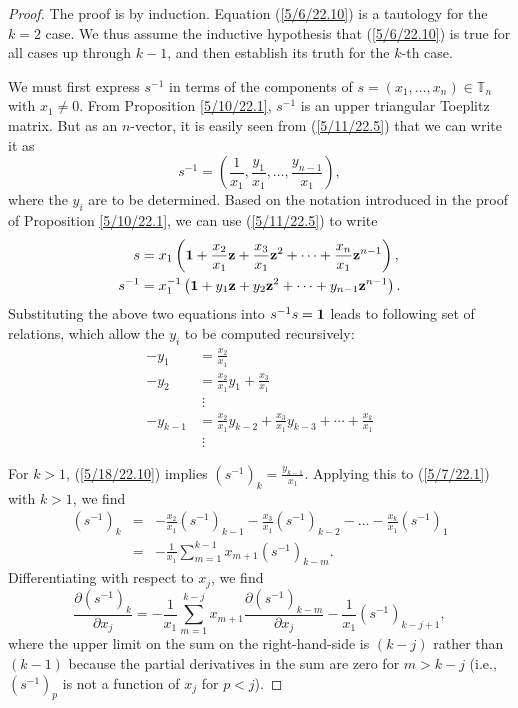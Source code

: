 \documentclass{amsart}
\theoremstyle{definition}
\numberwithin{theorem}{section}
\numberwithin{equation}{section}
\begin{document}
\begin{proof} The proof is by induction. Equation (\ref{5/6/22.10}) is a tautology for the $k=2$ case.  We thus assume the inductive hypothesis that (\ref{5/6/22.10}) is true  for all cases up through $k-1$, and then establish its truth for the $k$-th case.


We must first express $s^{-1}$ in terms of the components of  $s=(x_1,\dots,x_n)\in \mathbb{T}_n$ with $x_1\ne 0$.   From Proposition \ref{5/10/22.1},  $s^{-1}$ is an upper triangular Toeplitz matrix.  But as an $n$-vector, it is easily seen from (\ref{5/11/22.5}) that we can write it as  \begin{equation}\label{5/9/22.1} s^{-1} = (\frac{1}{x_1}, \frac{y_1}{x_1},\dots, \frac{y_{n-1}}{x_1}),\end{equation} where the $y_i$ are to be determined. 
Based on the notation introduced in the proof of Proposition \ref{5/10/22.1}, we can use (\ref{5/11/22.5}) to write 
\begin{align}\nonumber s &= x_1 \left({\bf 1} + \frac{x_2}{x_1} {\bf z} + \frac{x_3}{x_1} {\bf z}^2 + \cdots + \frac{x_n}{x_1} {\bf z}^{n-1}\right), \\ s^{-1} &= x_1^{-1} \left({\bf 1} + y_1 {\bf z} + y_2 {\bf z}^2 + \cdots + y_{n-1} {\bf z}^{n-1}\right).  \label{5/18/22.10} \end{align}  Substituting the above two equations into $s^{-1} s = {\bf 1}$ leads to following set of relations, which allow the $y_i$ to be computed recursively:
\begin{align} -y_1 &= \frac{x_2}{x_1} \nonumber \\ -y_2 &= \frac{x_2}{x_1}y_1 + \frac{x_3}{x_1} \nonumber \\ &\;\vdots \nonumber \\ -y_{k-1} &= \frac{x_2}{x_1} y_{k-2} + \frac{x_3}{x_1} y_{k-3} + \cdots + \frac{x_k}{x_1} \label{5/7/22.1} \\ &\;\vdots \nonumber \end{align} 
 
 \noindent For $k>1$, (\ref{5/18/22.10}) implies  $\left( s^{-1} \right)_k = \frac{y_{k-1}}{x_1}$.  Applying this to (\ref{5/7/22.1}) with $k>1$, we find
\begin{eqnarray} \nonumber \left( s^{-1} \right)_k &=& -\frac{x_2}{x_1}\left( s^{-1} \right)_{k-1} - \frac{x_3}{x_1}\left( s^{-1} \right)_{k-2} -\dots  - \frac{x_k}{x_1}\left( s^{-1} \right)_1 \\ &=& -\frac{1}{x_1}\sum_{m=1}^{k-1} x_{m+1}\left( s^{-1} \right)_{k-m}. \label{5/7/22.2}\end{eqnarray}
Differentiating with respect to $x_j$, we find \begin{equation}  \frac{\partial \left( s^{-1} \right)_k}{\partial x_j} = -\frac{1}{x_1} \sum_{m=1}^{k-j} x_{m+1} \frac{\partial \left( s^{-1} \right)_{k-m}}{\partial x_j} -  \frac{1}{x_1}\left( s^{-1} \right)_{k-j+1} \label{5/7/22.4}, \end{equation} where the upper limit on the sum on the right-hand-side is $(k-j)$ rather than $(k-1)$ because the partial derivatives in the sum are zero for $m> k-j$ (i.e., $\left( s^{-1} \right)_p$ is not a function of $x_j$ for $p<j$).  


\end{proof}
\end{document}
